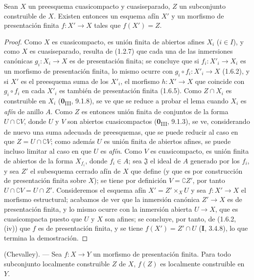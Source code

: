 \begin{lemma}[1.8.3]
\label{IV.1.8.3-fr}
Sean $X$ un preesquema cuasicompacto y cuasiseparado, $Z$ un subconjunto
construible de $X$. Existen entonces un esquema afín $X'$ y un morfismo
de presentación finita $f:X'\to X$ tales que $f(X')=Z$.
\end{lemma}

\begin{proof}
Como $X$ es cuasicompacto, es unión finita de abiertos afines $X_i$
($i\in I$), y como $X$ es cuasiseparado, resulta de (1.2.7) que cada una
de las inmersiones canónicas $g_i:X_i\to X$ es de presentación finita; se
concluye que si $f_i:X'_i\to X_i$ es un morfismo de presentación finita, lo
mismo ocurre con $g_i\circ f_i:X'_i\to X$ (1.6.2), y si $X'$ es el
preesquema suma de los $X'_i$, el morfismo $h:X'\to X$ que coincide con
$g_i\circ f_i$ en cada $X'_i$ es también de presentación finita
(1.6.5). Como $Z\cap X_i$ es construible en $X_i$
(\textbf{0}\textsubscript{III}, 9.1.8), se ve que se reduce a probar el lema
cuando $X_i$ es \emph{afín} de anillo $A$. Como $Z$ es entonces unión
finita de conjuntos de la forma $U\cap\complement V$, donde $U$ y $V$ son
abiertos cuasicompactos (\textbf{0}\textsubscript{III}, 9.1.3), se ve, considerando
de nuevo una suma adecuada de preesquemas, que se puede reducir al caso en que
$Z=U\cap\complement V$; como además $U$ es unión finita de abiertos
afines, se puede incluso limitar al caso en que $U$ es \emph{afín}. Como $V$
es cuasicompacto, es unión finita de abiertos de la forma $X_{f_i}$, donde
$f_i\in A$; sea $\mathfrak J$ el ideal de $A$ generado por los $f_i$, y
sea $Z'$ el subesquema cerrado afín de $X$ que define (y que es por
construcción de presentación finita sobre $X$); se tiene por definición
$V=\complement Z'$, por tanto $U\cap\complement V=U\cap Z'$. Consideremos el
esquema afín $X'=Z'\times_XU$
y sea $f:X'\to X$ el morfismo estructural; acabamos de ver que
la inmersión canónica $Z'\to X$ es de presentación finita, y lo mismo ocurre
con la inmersión abierta $U\to X$, que es cuasicompacta puesto que $U$ y
$X$ son afines; se concluye, por tanto, de (1.6.2, (iv)) que $f$ es de
presentación finita, y se tiene $f(X')=Z'\cap U$ (\textbf{I}, 3.4.8), lo que termina la
demostración.
\end{proof}

\begin{theorem}[1.8.4]
\label{IV.1.8.4-fr}
\textup{(Chevalley).} --- Sea $f:X\to Y$ un morfismo de presentación
finita. Para todo subconjunto localmente construible $Z$ de $X$, $f(Z)$ es
localmente construible en $Y$.
\end{theorem}

